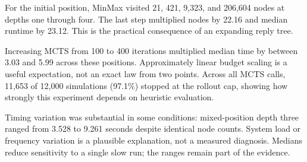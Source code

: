 For the initial position, MinMax visited 21, 421, 9,323, and 206,604 nodes at depths one through four. The last step multiplied nodes by 22.16 and median runtime by 23.12. This is the practical consequence of an expanding reply tree.

Increasing MCTS from 100 to 400 iterations multiplied median time by between 3.03 and 5.99 across these positions. Approximately linear budget scaling is a useful expectation, not an exact law from two points. Across all MCTS calls, 11,653 of 12,000 simulations (97.1\%) stopped at the rollout cap, showing how strongly this experiment depends on heuristic evaluation.

Timing variation was substantial in some conditions: mixed-position depth three ranged from 3.528 to 9.261 seconds despite identical node counts. System load or frequency variation is a plausible explanation, not a measured diagnosis. Medians reduce sensitivity to a single slow run; the ranges remain part of the evidence.
